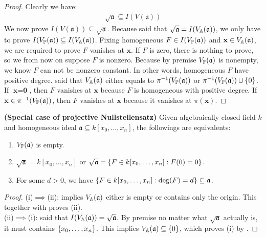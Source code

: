 \documentclass{report}
\begin{document}
\begin{proof}
Clearly we have: 
\begin{align*}
\sqrt{\mathfrak{a}}\subseteq I(V(\mathfrak{a}))
\end{align*}
We now prove $I(V(\mathfrak{a}))\subseteq \sqrt{\mathfrak{a}} $. Because  said that $\sqrt{\mathfrak{a}}=I(V_\A(\mathfrak{a}))$, we only have to prove $I(V_\P(\mathfrak{a}))\subseteq I(V_\A(\mathfrak{a})) $. Fixing homogeneous $F \in I(V_{\P}(\mathfrak{a}))$ and $\textbf{x}\in V_\A(\mathfrak{a})$, we are required to prove $F$ vanishes at $\textbf{x}$. If $F$ is zero, there is nothing to prove, so we from now on suppose $F$ is nonzero. Because by premise $V_\P(\mathfrak{a})$ is nonempty, we know $F$ can not be nonzero constant. In other words, homogeneous $F$ have positive degree.  said that $V_\A(\mathfrak{a})$ either equals to $\pi^{-1}(V_\P(\mathfrak{a}))$ or $\pi ^{-1}(V_\P(\mathfrak{a}))\cup \set{0}$. If $\textbf{x}=\textbf{0}$, then $F$ vanishes at  $\textbf{x}$ because $F$ is homogeneous with positive degree. If  $\textbf{x}\in \pi ^{-1}(V_\P( \mathfrak{a}))$, then $F$ vanishes at $\textbf{x}$ because it vanishes at $\pi (\textbf{x})$. 
\end{proof}
\begin{theorem}
\textbf{(Special case of projective Nullstellensatz)} Given algebraically closed field $k$ and homogeneous ideal $\mathfrak{a}\subseteq k[x_0,\dots ,x_n]$, the followings are equivalents: 
\begin{enumerate}[label=(\roman*)]
  \item $V_\P(\mathfrak{a})$ is empty. 
  \item $\sqrt{\mathfrak{a}}=k[x_0,\dots ,x_n]$ or $\sqrt{\mathfrak{a}}=\set{F \in k[x_0,\dots ,x_n]:F(0)=0}$. 
  \item For some  $d>0$, we have  $\set{F \in k[x_0,\dots ,x_n]:\operatorname{deg}(F)=d}\subseteq \mathfrak{a}$. 
\end{enumerate}
\end{theorem}
\begin{proof}
(i)$\implies $(ii):   implies $V_\A(\mathfrak{a})$ either is empty or contains only the origin. This together with  proves (ii).\\

(ii)$\implies $(i):  said that $I(V_\A(\mathfrak{a}))=\sqrt{\mathfrak{a}}$. By premise no matter what  $\sqrt{\mathfrak{a}}$ actually is, it must contains $\set{x_0,\dots ,x_n}$. This implies $V_\A(\mathfrak{a})\subseteq \set{0}$, which proves (i) by . 
\end{proof}
\end{document}
